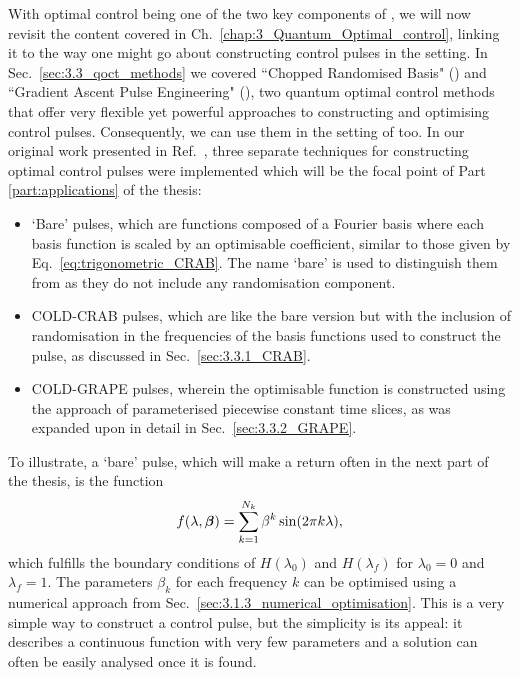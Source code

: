 With optimal control being one of the two key components of , we will now revisit the content covered in Ch.~\ref{chap:3_Quantum_Optimal_control}, linking it to the way one might go about constructing control pulses in the  setting. In Sec.~\ref{sec:3.3_qoct_methods} we covered ``Chopped Randomised Basis" () and ``Gradient Ascent Pulse Engineering" (), two quantum optimal control methods that offer very flexible yet powerful approaches to constructing and optimising control pulses. Consequently, we can use them in the setting of  too. In our original work presented in Ref.~\cite{cepaite_counterdiabatic_2023}, three separate techniques for constructing optimal control pulses were implemented which will be the focal point of Part \ref{part:applications} of the thesis:
\begin{itemize}
    \item `Bare' pulses, which are functions composed of a Fourier basis where each basis function is scaled by an optimisable coefficient, similar to those given by Eq.~\ref{eq:trigonometric_CRAB}. The name `bare' is used to distinguish them from  as they do not include any randomisation component.
    \item COLD-CRAB pulses, which are like the bare version but with the inclusion of randomisation in the frequencies of the basis functions used to construct the pulse, as discussed in Sec.~\ref{sec:3.3.1_CRAB}.
    \item COLD-GRAPE pulses, wherein the optimisable function is constructed using the  approach of parameterised piecewise constant time slices, as was expanded upon in detail in Sec.~\ref{sec:3.3.2_GRAPE}. 
\end{itemize}

To illustrate, a `bare' pulse, which will make a return often in the next part of the thesis, is the function
\begin{equation}\label{eq:bare_pulse}
    f(\lambda, \boldsymbol{\beta}) = \sum_{k=1}^{N_k} \beta^k \sin (2 \pi k \lambda),
\end{equation}
which fulfills the boundary conditions of $H(\lambda_0)$ and $H(\lambda_f)$ for $\lambda_0 = 0$ and $\lambda_f = 1$. The parameters $\beta_k$ for each frequency $k$ can be optimised using a numerical approach from Sec.~\ref{sec:3.1.3_numerical_optimisation}. This is a very simple way to construct a control pulse, but the simplicity is its appeal: it describes a continuous function with very few parameters and a solution can often be easily analysed once it is found.

